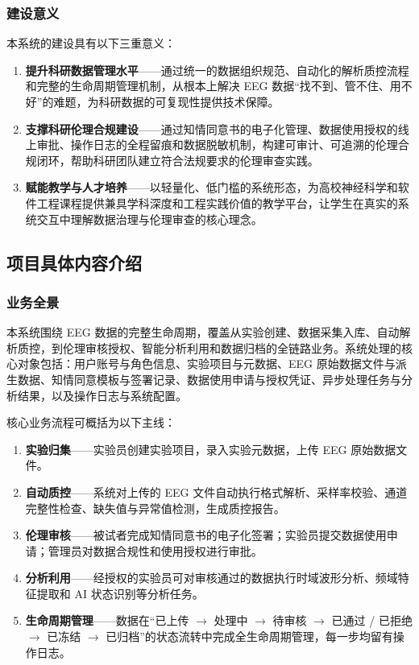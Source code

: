 \subsubsection{建设意义}

本系统的建设具有以下三重意义：

\begin{enumerate}
  \item \textbf{提升科研数据管理水平}——通过统一的数据组织规范、自动化的解析质控流程和完整的生命周期管理机制，从根本上解决 EEG 数据``找不到、管不住、用不好''的难题，为科研数据的可复现性提供技术保障。
  \item \textbf{支撑科研伦理合规建设}——通过知情同意书的电子化管理、数据使用授权的线上审批、操作日志的全程留痕和数据脱敏机制，构建可审计、可追溯的伦理合规闭环，帮助科研团队建立符合法规要求的伦理审查实践。
  \item \textbf{赋能教学与人才培养}——以轻量化、低门槛的系统形态，为高校神经科学和软件工程课程提供兼具学科深度和工程实践价值的教学平台，让学生在真实的系统交互中理解数据治理与伦理审查的核心理念。
\end{enumerate}

\subsection{项目具体内容介绍}

\subsubsection{业务全景}

本系统围绕 EEG 数据的完整生命周期，覆盖从实验创建、数据采集入库、自动解析质控，到伦理审核授权、智能分析利用和数据归档的全链路业务。系统处理的核心对象包括：用户账号与角色信息、实验项目与元数据、EEG 原始数据文件与派生数据、知情同意模板与签署记录、数据使用申请与授权凭证、异步处理任务与分析结果，以及操作日志与系统配置。

核心业务流程可概括为以下主线：

\begin{enumerate}
  \item \textbf{实验归集}——实验员创建实验项目，录入实验元数据，上传 EEG 原始数据文件。
  \item \textbf{自动质控}——系统对上传的 EEG 文件自动执行格式解析、采样率校验、通道完整性检查、缺失值与异常值检测，生成质控报告。
  \item \textbf{伦理审核}——被试者完成知情同意书的电子化签署；实验员提交数据使用申请；管理员对数据合规性和使用授权进行审批。
  \item \textbf{分析利用}——经授权的实验员可对审核通过的数据执行时域波形分析、频域特征提取和 AI 状态识别等分析任务。
  \item \textbf{生命周期管理}——数据在``已上传 $\to$ 处理中 $\to$ 待审核 $\to$ 已通过 / 已拒绝 $\to$ 已冻结 $\to$ 已归档''的状态流转中完成全生命周期管理，每一步均留有操作日志。
\end{enumerate}

